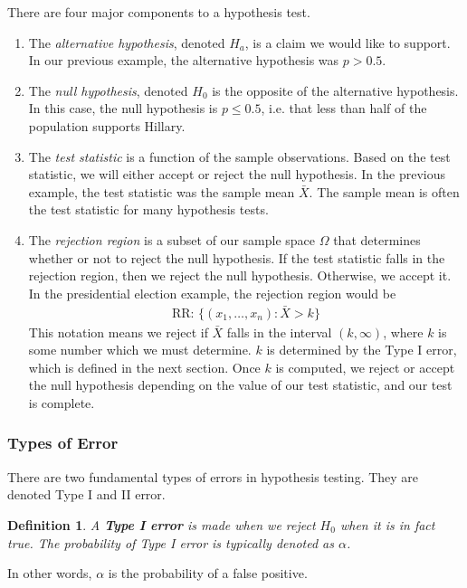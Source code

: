 \documentclass[11pt,letterpaper]{article}
\numberwithin{theorem}{section}
\newtheorem{definition}[theorem]{Definition}
\numberwithin{definition}{section}
\numberwithin{lemma}{section}
\numberwithin{corollary}{section}
\numberwithin{proposition}{section}
\theoremstyle{definition}
\numberwithin{remark}{section}
\numberwithin{claim}{section}
\numberwithin{observation}{section}
\numberwithin{fact}{section}
\numberwithin{assumption}{section}
\numberwithin{example}{section}
\numberwithin{exercise}{section}
\begin{document}
There are four major components to a hypothesis test. 
\begin{enumerate}
\item The \textit{alternative hypothesis}, denoted $H_a$, is a claim we would like to support. In our previous example, the alternative hypothesis was $p > 0.5$. 

\item The \textit{null hypothesis}, denoted $H_0$ is the opposite of the alternative hypothesis. In this case, the null hypothesis is $p \leq 0.5$, i.e. that less than half of the population supports Hillary.

\item The \textit{test statistic} is a function of the sample observations. Based on the test statistic, we will either accept or reject the null hypothesis. In the previous example, the test statistic was the sample mean $\bar{X}$. The sample mean is often the test statistic for many hypothesis tests.

\item The \textit{rejection region} is a subset of our sample space $\Omega$ that determines whether or not to reject the null hypothesis. If the test statistic falls in the rejection region, then we reject the null hypothesis. Otherwise, we accept it. In the presidential election example, the rejection region would be 
\begin{align*}
\text{RR: } \{(x_1,\dots,x_n) : \bar{X} > k\}
\end{align*}
This notation means we reject if $\bar{X}$ falls in the interval $(k,\infty)$, where $k$ is some number which we must determine. $k$ is determined by the Type I error, which is defined in the next section. Once $k$ is computed, we reject or accept the null hypothesis depending on the value of our test statistic, and our test is complete.
\end{enumerate}

\subsubsection{Types of Error}
There are two fundamental types of errors in hypothesis testing. They are denoted Type I and II error.

\begin{definition}
A \textbf{Type I error} is made when we reject $H_0$ when it is in fact true. The probability of Type I error is typically denoted as $\alpha$.
\end{definition}
In other words, $\alpha$ is the probability of a false positive.
\end{document}
